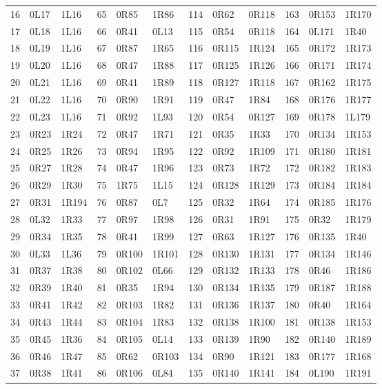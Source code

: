 \begin{longtable}{rll@{\hspace{1.3em}}rll@{\hspace{1.3em}}rll@{\hspace{1.3em}}rll}
16 & 0L17 & 1L16 & 65 & 0R85 & 1R86 & 114 & 0R62 & 0R118 & 163 & 0R153 & 1R170\\
17 & 0L18 & 1L16 & 66 & 0R41 & 0L13 & 115 & 0R54 & 0R118 & 164 & 0L171 & 1R40\\
18 & 0L19 & 1L16 & 67 & 0R87 & 1R65 & 116 & 0R115 & 1R124 & 165 & 0R172 & 1R173\\
19 & 0L20 & 1L16 & 68 & 0R47 & 1R88 & 117 & 0R125 & 1R126 & 166 & 0R171 & 1R174\\
20 & 0L21 & 1L16 & 69 & 0R41 & 1R89 & 118 & 0R127 & 1R118 & 167 & 0R162 & 1R175\\
21 & 0L22 & 1L16 & 70 & 0R90 & 1R91 & 119 & 0R47 & 1R84 & 168 & 0R176 & 1R177\\
22 & 0L23 & 1L16 & 71 & 0R92 & 1L93 & 120 & 0R54 & 0R127 & 169 & 0R178 & 1L179\\
23 & 0R23 & 1R24 & 72 & 0R47 & 1R71 & 121 & 0R35 & 1R33 & 170 & 0R134 & 1R153\\
24 & 0R25 & 1R26 & 73 & 0R94 & 1R95 & 122 & 0R92 & 1R109 & 171 & 0R180 & 1R181\\
25 & 0R27 & 1R28 & 74 & 0R47 & 1R96 & 123 & 0R73 & 1R72 & 172 & 0R182 & 1R183\\
26 & 0R29 & 1R30 & 75 & 1R75 & 1L15 & 124 & 0R128 & 1R129 & 173 & 0R184 & 1R184\\
27 & 0R31 & 1R194 & 76 & 0R87 & 0L7 & 125 & 0R32 & 1R64 & 174 & 0R185 & 1R176\\
28 & 0L32 & 1R33 & 77 & 0R97 & 1R98 & 126 & 0R31 & 1R91 & 175 & 0R32 & 1R179\\
29 & 0R34 & 1R35 & 78 & 0R41 & 1R99 & 127 & 0R63 & 1R127 & 176 & 0R135 & 1R40\\
30 & 0L33 & 1L36 & 79 & 0R100 & 1R101 & 128 & 0R130 & 1R131 & 177 & 0R134 & 1R146\\
31 & 0R37 & 1R38 & 80 & 0R102 & 0L66 & 129 & 0R132 & 1R133 & 178 & 0R46 & 1R186\\
32 & 0R39 & 1R40 & 81 & 0R35 & 1R94 & 130 & 0R134 & 1R135 & 179 & 0R187 & 1R188\\
33 & 0R41 & 1R42 & 82 & 0R103 & 1R82 & 131 & 0R136 & 1R137 & 180 & 0R40 & 1R164\\
34 & 0R43 & 1R44 & 83 & 0R104 & 1R83 & 132 & 0R138 & 1R100 & 181 & 0R138 & 1R153\\
35 & 0R45 & 1R36 & 84 & 0R105 & 0L14 & 133 & 0R139 & 1R90 & 182 & 0R140 & 1R189\\
36 & 0R46 & 1R47 & 85 & 0R62 & 0R103 & 134 & 0R90 & 1R121 & 183 & 0R177 & 1R168\\
37 & 0R38 & 1R41 & 86 & 0R106 & 0L84 & 135 & 0R140 & 1R141 & 184 & 0L190 & 1R191\\

\end{longtable}
